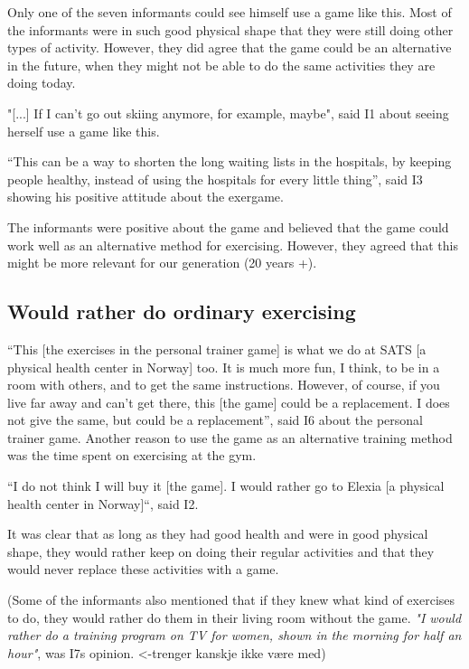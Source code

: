 Only one of the seven informants could see himself use a game like this. Most of the informants were in such good physical shape that they were still doing other types of activity. However, they did agree that the game could be an alternative in the future, when they might not be able to do the same activities they are doing today. 

"[...] If I can't go out skiing anymore, for example, maybe", said I1 about seeing herself use a game like this. 

“This can be a way to shorten the long waiting lists in the hospitals, by keeping people healthy, instead of using the hospitals for every little thing”, said I3 showing his positive attitude about the exergame. 

The informants were positive about the game and believed that the game could work well as an alternative method for exercising. However, they agreed that this might be more relevant for our generation (20 years +). 

\subsection{Would rather do ordinary exercising}
“This [the exercises in the personal trainer game] is what we do at SATS [a physical health center in Norway] too. It is much more fun, I think, to be in a room with others, and to get the same instructions. However, of course, if you live far away and can't get there, this [the game] could be a replacement. I does not give the same, but could be a replacement”, said I6 about the personal trainer game. Another reason to use the game as an alternative training method was the time spent on exercising at the gym.

“I do not think I will buy it [the game]. I would rather go to Elexia [a physical health center in Norway]“, said I2.

It was clear that as long as they had good health and were in good physical shape, they would rather keep on doing their regular activities and that they would never replace these activities with a game. 

(Some of the informants also mentioned that if they knew what kind of exercises to do, they would rather do them in their living room without the game. 
\emph{"I would rather do a training program on TV for women, shown in the morning for half an hour"}, was I7s opinion. <-trenger kanskje ikke være med)


